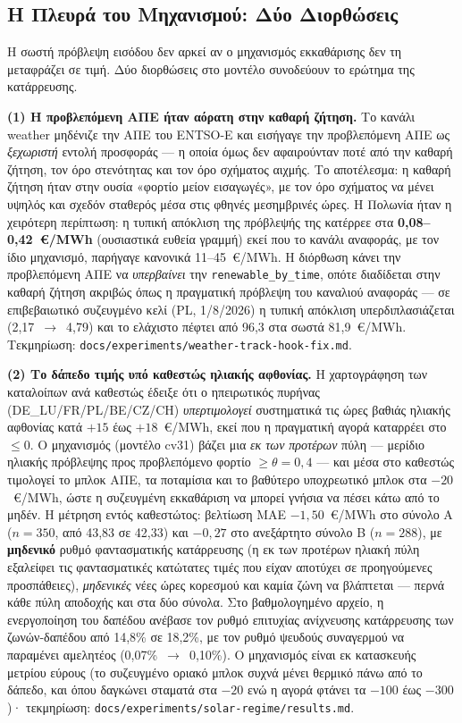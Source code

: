 \subsection{Η Πλευρά του Μηχανισμού: Δύο Διορθώσεις}
\label{subsec:collapse-mechanism}

Η σωστή πρόβλεψη εισόδου δεν αρκεί αν ο μηχανισμός εκκαθάρισης δεν τη μεταφράζει σε τιμή. Δύο διορθώσεις στο μοντέλο συνοδεύουν το ερώτημα της κατάρρευσης.

\textbf{(1) Η προβλεπόμενη ΑΠΕ ήταν αόρατη στην καθαρή ζήτηση.} Το κανάλι weather μηδένιζε την ΑΠΕ του ENTSO-E και εισήγαγε την προβλεπόμενη ΑΠΕ ως \emph{ξεχωριστή} εντολή προσφοράς --- η οποία όμως δεν αφαιρούνταν ποτέ από την καθαρή ζήτηση, τον όρο στενότητας και τον όρο σχήματος αιχμής. Το αποτέλεσμα: η καθαρή ζήτηση ήταν στην ουσία «φορτίο μείον εισαγωγές», με τον όρο σχήματος να μένει υψηλός και σχεδόν σταθερός μέσα στις φθηνές μεσημβρινές ώρες. Η Πολωνία ήταν η χειρότερη περίπτωση: η τυπική απόκλιση της πρόβλεψής της κατέρρεε στα \textbf{0,08--0,42~€/MWh} (ουσιαστικά ευθεία γραμμή) εκεί που το κανάλι αναφοράς, με τον ίδιο μηχανισμό, παρήγαγε κανονικά 11--45~€/MWh. Η διόρθωση κάνει την προβλεπόμενη ΑΠΕ να \emph{υπερβαίνει} την \texttt{renewable\_by\_time}, οπότε διαδίδεται στην καθαρή ζήτηση ακριβώς όπως η πραγματική πρόβλεψη του καναλιού αναφοράς --- σε επιβεβαιωτικό συζευγμένο κελί (PL, 1/8/2026) η τυπική απόκλιση υπερδιπλασιάζεται (2,17~$\to$~4,79) και το ελάχιστο πέφτει από 96,3 στα σωστά 81,9~€/MWh. Τεκμηρίωση: \texttt{docs/experiments/weather-track-hook-fix.md}.

\textbf{(2) Το δάπεδο τιμής υπό καθεστώς ηλιακής αφθονίας.} Η χαρτογράφηση των καταλοίπων ανά καθεστώς έδειξε ότι ο ηπειρωτικός πυρήνας (DE\_LU/FR/PL/BE/CZ/CH) \emph{υπερτιμολογεί} συστηματικά τις ώρες βαθιάς ηλιακής αφθονίας κατά $+15$ έως $+18$~€/MWh, εκεί που η πραγματική αγορά καταρρέει στο $\le 0$. Ο μηχανισμός (μοντέλο cv31) βάζει μια \emph{εκ των προτέρων} πύλη --- μερίδιο ηλιακής πρόβλεψης προς προβλεπόμενο φορτίο $\ge \theta = 0{,}4$ --- και μέσα στο καθεστώς τιμολογεί το μπλοκ ΑΠΕ, τα ποταμίσια και το βαθύτερο υποχρεωτικό μπλοκ στα $-20$~€/MWh, ώστε η συζευγμένη εκκαθάριση να μπορεί γνήσια να πέσει κάτω από το μηδέν. Η μέτρηση εντός καθεστώτος: βελτίωση MAE $-1{,}50$~€/MWh στο σύνολο Α ($n=350$, από 43,83 σε 42,33) και $-0{,}27$ στο ανεξάρτητο σύνολο Β ($n=288$), με \textbf{μηδενικό} ρυθμό φαντασματικής κατάρρευσης (η εκ των προτέρων ηλιακή πύλη εξαλείφει τις φαντασματικές κατώτατες τιμές που είχαν αποτύχει σε προηγούμενες προσπάθειες), \emph{μηδενικές} νέες ώρες κορεσμού και καμία ζώνη να βλάπτεται --- περνά κάθε πύλη αποδοχής και στα δύο σύνολα. Στο βαθμολογημένο αρχείο, η ενεργοποίηση του δαπέδου ανέβασε τον ρυθμό επιτυχίας ανίχνευσης κατάρρευσης των ζωνών-δαπέδου από 14,8\% σε 18,2\%, με τον ρυθμό ψευδούς συναγερμού να παραμένει αμελητέος (0,07\%~$\to$~0,10\%). Ο μηχανισμός είναι εκ κατασκευής μετρίου εύρους (το συζευγμένο οριακό μπλοκ συχνά μένει θερμικό πάνω από το δάπεδο, και όπου δαγκώνει σταματά στα $-20$ ενώ η αγορά φτάνει τα $-100$ έως $-300$)· τεκμηρίωση: \texttt{docs/experiments/solar-regime/results.md}.

